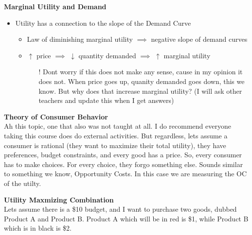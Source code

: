 \textbf{Marginal Utility and Demand}
\begin{itemize}
    \item Utility has a connection to the slope of the Demand Curve
        \begin{itemize}
            \item Law of diminishing marginal utility $\implies$ negative slope of demand curves
            \item $\uparrow$ price $\implies$ $\downarrow$ quantity demanded $\implies$ $\uparrow$ marginal utility
                \begin{itemize}
                    \item[!] Dont worry if this does not make any sense, cause in my opinion it does not. When price goes up, quanity demanded goes down, this we know. But why does that increase marginal utility? (I will ask other teachers and update this when I get answers)
                \end{itemize}
        \end{itemize}
\end{itemize}

\textbf{Theory of Consumer Behavior}\\
Ah this topic, one that also was not taught at all. I do recommend everyone taking this course does do external activities. But regardless, lets assume a consumer is rational (they want to maximize their total utility), they have preferences, budget constraints, and every good has a price. So, every consumer has to make choices. For every choice, they forgo something else. Sounds similar to something we know, Opportunity Costs. In this case we are measuring the OC of the utilty. 

\textbf{Utility Maxmizing Combination}\\
Lets assume there is a \$10 budget, and I want to purchase two goods, dubbed Product A and Product B. Product A which will be in red is \$1, while Product B which is in black is \$2. 

